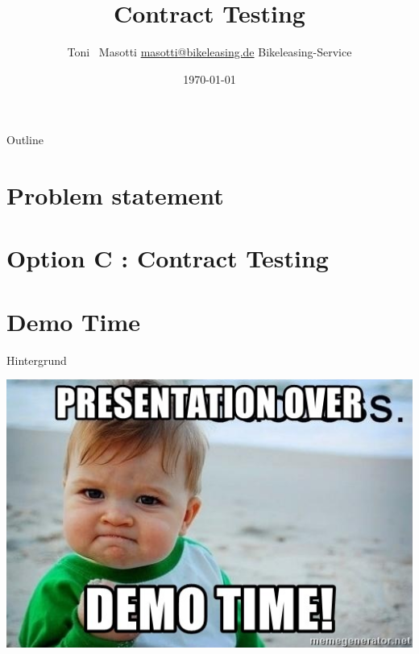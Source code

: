 


\title[Contract Testing]{Contract Testing }
\author[Toni Masotti]{\texorpdfstring{Toni ~Masotti  \newline \url{masotti@bikeleasing.de} \newline Bikeleasing-Service}{Toni Masotti}}
\date{\today}




	\begin{frame}
		\maketitle
	\end{frame}

	\begin{frame}{Outline}
		\tableofcontents
	\end{frame}


	\AtBeginSection[ ]
	{
		\frame{\tableofcontents[currentsection]}
	}

	


	\section{Problem statement}

	


	\section{Option C : Contract Testing}

	


	\section{Demo Time}

	\begin{frame}{Hintergrund}

		\begin{center}
			\includegraphics[width=.8\textwidth]{./assets/demo_time}
		\end{center}

	\end{frame}


